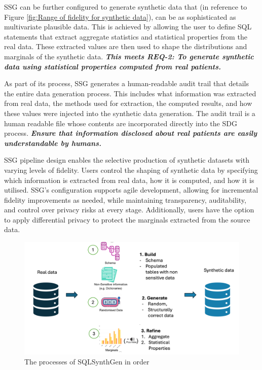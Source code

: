 \documentclass[11pt]{article}
\begin{document}
SSG can be further configured to generate synthetic data that (in reference to Figure \ref{fig:Range of fidelity for synthetic data}), can be as sophisticated as multivariate plausible data. This is achieved by allowing the user to define SQL statements that extract aggregate statistics and statistical properties from the real data. These extracted values are then used to shape the distributions and marginals of the synthetic data. \textbf{\textit{This meets REQ-2: To generate synthetic data using statistical properties computed from real patients.}} 

As part of its process, SSG generates a human-readable audit trail that details the entire data generation process. This includes what information was extracted from real data, the methods used for extraction, the computed results, and how these values were injected into the synthetic data generation. The audit trail is a human readable file whose contents are incorporated directly into the SDG process. \textbf{\textit{Ensure that information disclosed about real patients are easily understandable by humans.}}

SSG pipeline design enables the selective production of synthetic datasets with varying levels of fidelity. Users control the shaping of synthetic data by specifying which information is extracted from real data, how it is computed, and how it is utilised. SSG’s configuration supports agile development, allowing for incremental fidelity improvements as needed, while maintaining transparency, auditability, and control over privacy risks at every stage. Additionally, users have the option to apply differential privacy to protect the marginals extracted from the source data.

\begin{figure}[ht]
\centering
\includegraphics[width=0.8\linewidth]{figures/Process.png}
\caption{The processes of SQLSynthGen in order}
\label{fig:SSG Process}
\end{figure}
\end{document}
